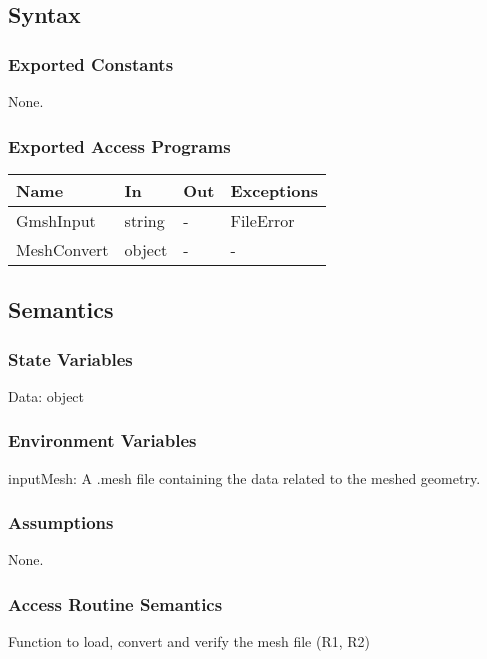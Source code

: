 \documentclass[12pt, titlepage]{article}
\begin{document}
\subsection{Syntax}

\subsubsection{Exported Constants}
None.
\subsubsection{Exported Access Programs}

\begin{center}
	\begin{tabular}{p{4cm} p{2cm} p{2cm} p{2cm}}
		\hline
		\textbf{Name} & \textbf{In} & \textbf{Out} & \textbf{Exceptions} \\
		\hline
		GmshInput & string & - & FileError \\
		MeshConvert & object & - & -\\
		\hline
	\end{tabular}
\end{center}

\subsection{Semantics}

\subsubsection{State Variables}

Data: object

\subsubsection{Environment Variables}
inputMesh: A .mesh file containing the data related to the meshed geometry.

\subsubsection{Assumptions}

None.

\subsubsection{Access Routine Semantics}

Function to load, convert and verify the mesh file (R1, R2)
\end{document}
